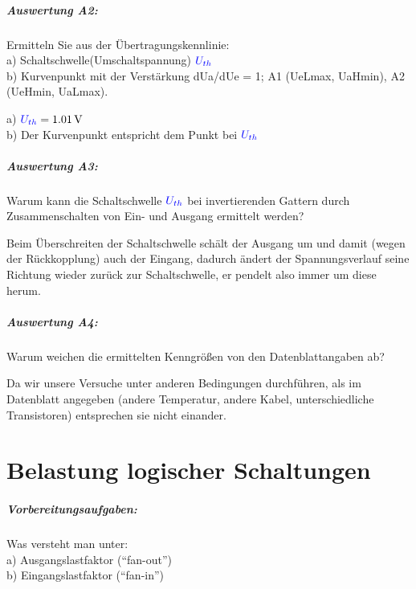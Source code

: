 \documentclass[a4paper,titlepage,parskip]{scrreprt}
\newcommand{\spannung}[1]{\textcolor{blue}{#1}}
\begin{document}
        \paragraph{Auswertung A2:} Ermitteln Sie aus der Übertragungskennlinie:\\
          a) Schaltschwelle(Umschaltspannung) $\spannung{U_{th}}$\\
          b) Kurvenpunkt mit der Verstärkung dUa/dUe = 1; A1 (UeLmax, UaHmin), A2 (UeHmin, UaLmax).

        a) $\spannung{U_{th}} = \SI{1,01}{\volt}$\\
        b) Der Kurvenpunkt entspricht dem Punkt bei $\spannung{U_{th}}$
    
        \paragraph{Auswertung A3:}\label{sec:auswertung-a3} Warum kann die Schaltschwelle $\spannung{U_{th}}$ bei invertierenden Gattern durch Zusammenschalten von Ein- und Ausgang ermittelt werden?

          Beim Überschreiten der Schaltschwelle schält der Ausgang um und damit (wegen der Rückkopplung) auch der Eingang, dadurch ändert der Spannungsverlauf seine Richtung wieder zurück zur Schaltschwelle, er pendelt also immer um diese herum.

        \paragraph{Auswertung A4:} Warum weichen die ermittelten Kenngrößen von den Datenblattangaben ab?

          Da wir unsere Versuche unter anderen Bedingungen durchführen, als im Datenblatt angegeben (andere Temperatur, andere Kabel, unterschiedliche Transistoren) entsprechen sie nicht einander.

    \chapter{Belastung logischer Schaltungen}
      \paragraph{Vorbereitungsaufgaben:} Was versteht man unter:\\
        a) Ausgangslastfaktor ("`fan-out"')\\
        b) Eingangslastfaktor ("`fan-in"')
\end{document}
